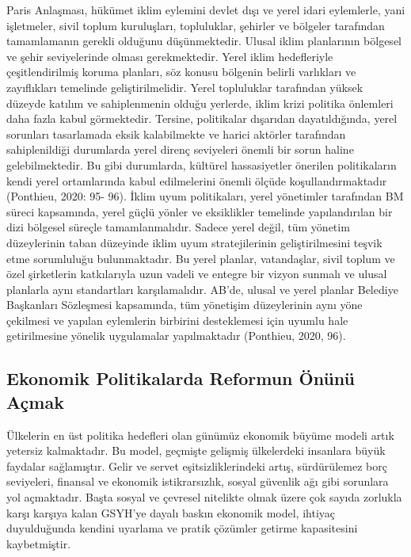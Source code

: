 \documentclass[
]{book}
\begin{document}
Paris Anlaşması, hükümet iklim eylemini devlet dışı ve yerel idari eylemlerle, yani işletmeler, sivil toplum kuruluşları, topluluklar, şehirler ve bölgeler tarafından tamamlamanın gerekli olduğunu düşünmektedir. Ulusal iklim planlarının bölgesel ve şehir seviyelerinde olması gerekmektedir. Yerel iklim hedefleriyle çeşitlendirilmiş koruma planları, söz konusu bölgenin belirli varlıkları ve zayıflıkları temelinde geliştirilmelidir. Yerel topluluklar tarafından yüksek düzeyde katılım ve sahiplenmenin olduğu yerlerde, iklim krizi politika önlemleri daha fazla kabul görmektedir. Tersine, politikalar dışarıdan dayatıldığında, yerel sorunları tasarlamada eksik kalabilmekte ve harici aktörler tarafından sahiplenildiği durumlarda yerel direnç seviyeleri önemli bir sorun haline gelebilmektedir. Bu gibi durumlarda, kültürel hassasiyetler önerilen politikaların kendi yerel ortamlarında kabul edilmelerini önemli ölçüde koşullandırmaktadır (Ponthieu, 2020: 95- 96).
İklim uyum politikaları, yerel yönetimler tarafından BM süreci kapsamında, yerel güçlü yönler ve eksiklikler temelinde yapılandırılan bir dizi bölgesel süreçle tamamlanmalıdır. Sadece yerel değil, tüm yönetim düzeylerinin taban düzeyinde iklim uyum stratejilerinin geliştirilmesini teşvik etme sorumluluğu bulunmaktadır. Bu yerel planlar, vatandaşlar, sivil toplum ve özel şirketlerin katkılarıyla uzun vadeli ve entegre bir vizyon sunmalı ve ulusal planlarla aynı standartları karşılamalıdır. AB'de, ulusal ve yerel planlar Belediye Başkanları Sözleşmesi kapsamında, tüm yönetişim düzeylerinin aynı yöne çekilmesi ve yapılan eylemlerin birbirini desteklemesi için uyumlu hale getirilmesine yönelik uygulamalar yapılmaktadır (Ponthieu, 2020, 96).

\hypertarget{ekonomik-politikalarda-reformun-uxf6nuxfcnuxfc-auxe7mak}{%
\subsection{Ekonomik Politikalarda Reformun Önünü Açmak}\label{ekonomik-politikalarda-reformun-uxf6nuxfcnuxfc-auxe7mak}}

Ülkelerin en üst politika hedefleri olan günümüz ekonomik büyüme modeli artık yetersiz kalmaktadır. Bu model, geçmişte gelişmiş ülkelerdeki insanlara büyük faydalar sağlamıştır. Gelir ve servet eşitsizliklerindeki artış, sürdürülemez borç seviyeleri, finansal ve ekonomik istikrarsızlık, sosyal güvenlik ağı gibi sorunlara yol açmaktadır. Başta sosyal ve çevresel nitelikte olmak üzere çok sayıda zorlukla karşı karşıya kalan GSYH'ye dayalı baskın ekonomik model, ihtiyaç duyulduğunda kendini uyarlama ve pratik çözümler getirme kapasitesini kaybetmiştir.
\end{document}
